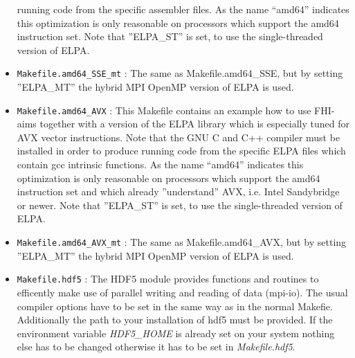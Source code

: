 \begin{itemize}
    running code from the specific assembler files. As the name
    ``amd64'' indicates this optimization is only reasonable on
    processors which support the amd64 instruction set.
    Note that ''ELPA\_ST'' is set, to use the single-threaded version
    of ELPA.
  \item \texttt{Makefile.amd64\_SSE\_mt} : The same as
    Makefile.amd64\_SSE, but by setting ''ELPA\_MT'' the hybrid MPI
    OpenMP version of ELPA is used.
  \item \texttt{Makefile.amd64\_AVX} : This Makefile contains an
    example how to use FHI-aims together with a version of the 
    ELPA library which is especially tuned for AVX vector instructions.
    Note that the GNU C and C++ compiler must be installed in order to produce
    running code from the specific ELPA files which contain gcc
    intrinsic functions. As the name  ``amd64'' indicates this
    optimization is only reasonable on  processors which support the 
    amd64 instruction set and which already ''understand'' AVX,
    i.e. Intel Sandybridge or newer. Note that ''ELPA\_ST'' is set, to 
    use the single-threaded version of ELPA.
  \item \texttt{Makefile.amd64\_AVX\_mt} : The same as
    Makefile.amd64\_AVX, but by setting ''ELPA\_MT'' the hybrid MPI
    OpenMP version of ELPA is used.
  \item \texttt{Makefile.hdf5} : The HDF5 module provides functions and routines to efficently make use of parallel writing and reading of data (mpi-io). The usual compiler options have to be set in the same way as in the normal Makefie. Additionally the path to your installation of hdf5 must be provided. If the environment variable \textit{HDF5\_HOME} is already set on your system nothing else has to be changed otherwise it has to be set in \textit{Makefile.hdf5}.

\end{itemize}

